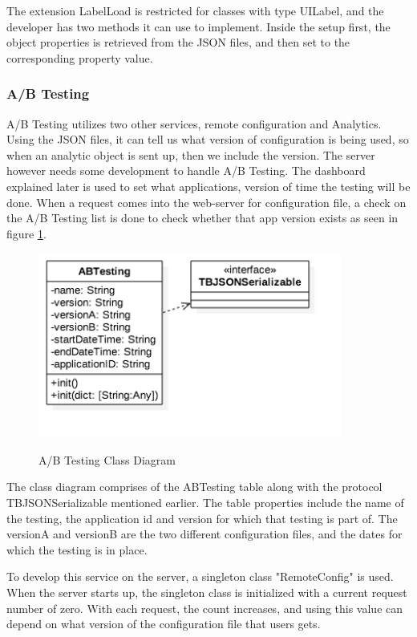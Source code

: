 The extension LabelLoad is restricted for classes with type UILabel, and the developer has two methods it can use to implement. Inside the setup first, the object properties is retrieved from the JSON files, and then set to the corresponding property value.



\subsubsection{A/B Testing}

A/B Testing utilizes two other services, remote configuration and Analytics. Using the JSON files, it can tell us what version of configuration is being used, so when an analytic object is sent up, then we include the version. The server however needs some development to handle A/B Testing. The dashboard explained later is used to set what applications, version of time the testing will be done. When a request comes into the web-server for configuration file, a check on the A/B Testing list is done to check whether that app version exists as seen in figure \ref{fig:abtesting-cd}. 

\begin{figure}[!h]
    \caption{A/B Testing Class Diagram}
    \centering
    \includegraphics[width=100mm]{images/classdiagrams/ABTesting}
    \label{fig:abtesting-cd}
\end{figure}

The class diagram comprises of the ABTesting table along with the protocol TBJSONSerializable mentioned earlier. The table properties include the name of the testing, the application id and version for which that testing is part of. The versionA and versionB are the two different configuration files, and the dates for which the testing is in place.

To develop this service on the server, a singleton class "RemoteConfig" is used. When the server starts up, the singleton class is initialized with a current request number of zero. With each request, the count increases, and using this value can depend on what version of the configuration file that users gets.

